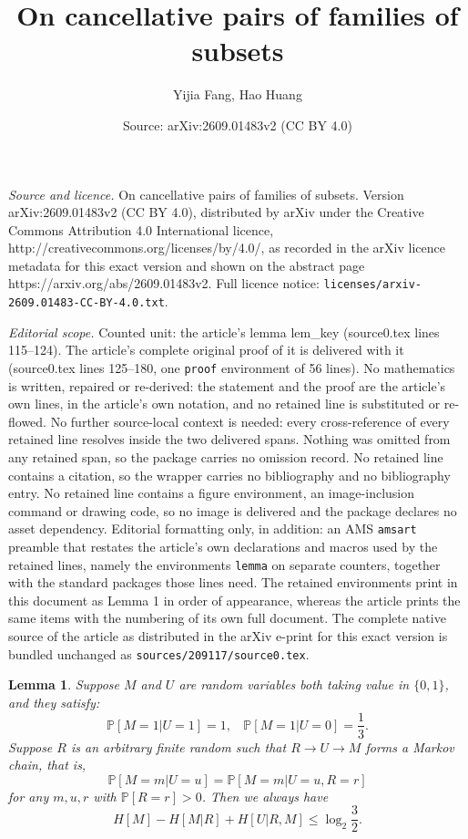 \documentclass[10pt,a4paper]{amsart}
\title{On cancellative pairs of families of subsets}
\author{Yijia Fang, Hao Huang}
\date{Source: arXiv:2609.01483v2 (CC BY 4.0)}
\newtheorem{lemma}{Lemma}
\begin{document}
\maketitle

\noindent\emph{Source and licence.} On cancellative pairs of families of subsets. Version arXiv:2609.01483v2 (CC BY 4.0), distributed by arXiv under the Creative Commons Attribution 4.0 International licence, http://creativecommons.org/licenses/by/4.0/, as recorded in the arXiv licence metadata for this exact version and shown on the abstract page https://arxiv.org/abs/2609.01483v2. Full licence notice: \texttt{licenses/arxiv-2609.01483-CC-BY-4.0.txt}.\par\smallskip

\noindent\textit{Editorial scope.} Counted unit: the article's lemma lem\_key (source0.tex lines 115--124). The article's complete original proof of it is delivered with it (source0.tex lines 125--180, one \texttt{proof} environment of 56 lines). No mathematics is written, repaired or re-derived: the statement and the proof are the article's own lines, in the article's own notation, and no retained line is substituted or re-flowed.  No further source-local context is needed: every cross-reference of every retained line resolves inside the two delivered spans.  Nothing was omitted from any retained span, so the package carries no omission record.  No retained line contains a citation, so the wrapper carries no bibliography and no bibliography entry.  No retained line contains a figure environment, an image-inclusion command or drawing code, so no image is delivered and the package declares no asset dependency.  Editorial formatting only, in addition: an AMS \texttt{amsart} preamble that restates the article's own declarations and macros used by the retained lines, namely the environments \texttt{lemma} on separate counters, together with the standard packages those lines need.  The retained environments print in this document as Lemma 1 in order of appearance, whereas the article prints the same items with the numbering of its own full document.  The complete native source of the article as distributed in the arXiv e-print for this exact version is bundled unchanged as \texttt{sources/209117/source0.tex}.
\begin{lemma}\label{lem_key}
Suppose $M$ and $U$ are random variables both taking value in $\{0, 1\}$, and they satisfy: 
$$\mathbb{P}[M=1|U=1]=1,~~~~\mathbb{P}[M=1|U=0]=\frac{1}{3}.$$ 
Suppose $R$ is an arbitrary finite random such that $R\to U \to M$ forms a Markov chain, that is,
$$
\mathbb{P}[M=m|U=u]=\mathbb{P}[M=m|U=u,R=r]
$$
for any $m,u,r$ with $\mathbb{P}[R=r]>0$. Then we always have $$H[M]-H[M|R]+H[U|R, M] \le \log_2 \frac{3}{2}.$$
\end{lemma}
\end{document}
